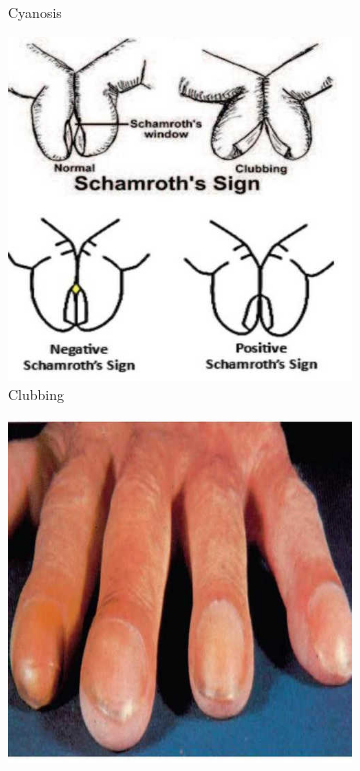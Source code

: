 \documentclass[a4paper,12pt,openany,twoside]{book}
\begin{document}
{\begin{figure}[h]
\begin{subfigure}[t]{.23\textwidth}
																	\caption{Cyanosis}
																	\label{Cyanosis4}
																\end{subfigure}
																\hspace{\fill}
																\begin{subfigure}[t]{.23\textwidth}
																	\centering
																	\includegraphics[width=\textwidth]{./clinicalPhysioPic/clubbing3-0.jpg}
																	\caption{Clubbing}
																	\label{Clubbing1}
																\end{subfigure}
																\hspace{\fill}
																\begin{subfigure}[t]{.23\textwidth}
																	\centering
																	\includegraphics[width=\textwidth]{./clinicalPhysioPic/clubbing3-1.jpg}

\end{subfigure}
\end{figure}}
\end{document}
